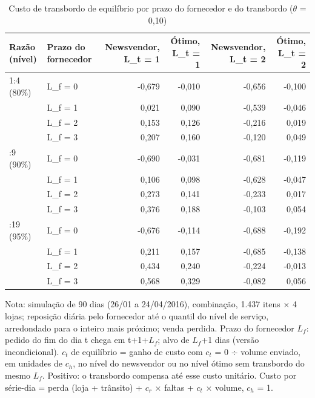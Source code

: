 \begin{table}[htbp]
\centering
\small
\caption{Custo de transbordo de equilíbrio por prazo do fornecedor e do transbordo ($\theta$ = 0,10)}
\label{tab:tbr_ct_equilibrio}
\begin{tabular}{llrrrr}
\toprule
Razão (nível) & Prazo do fornecedor & Newsvendor, L\_t = 1 & Ótimo, L\_t = 1 & Newsvendor, L\_t = 2 & Ótimo, L\_t = 2 \\
\midrule
1:4 (80\%) & L\_f = 0 & -0,679 & -0,010 & -0,656 & -0,100 \\
 & L\_f = 1 & 0,021 & 0,090 & -0,539 & -0,046 \\
 & L\_f = 2 & 0,153 & 0,126 & -0,216 & 0,019 \\
 & L\_f = 3 & 0,207 & 0,160 & -0,120 & 0,049 \\
\addlinespace
1:9 (90\%) & L\_f = 0 & -0,690 & -0,031 & -0,681 & -0,119 \\
 & L\_f = 1 & 0,106 & 0,098 & -0,628 & -0,047 \\
 & L\_f = 2 & 0,273 & 0,141 & -0,233 & 0,017 \\
 & L\_f = 3 & 0,376 & 0,188 & -0,103 & 0,054 \\
\addlinespace
1:19 (95\%) & L\_f = 0 & -0,676 & -0,114 & -0,688 & -0,192 \\
 & L\_f = 1 & 0,211 & 0,157 & -0,685 & -0,138 \\
 & L\_f = 2 & 0,434 & 0,240 & -0,224 & -0,013 \\
 & L\_f = 3 & 0,568 & 0,329 & -0,082 & 0,056 \\
\bottomrule
\end{tabular}
\par\smallskip
{\footnotesize Nota: simulação de 90 dias (26/01 a 24/04/2016), combinação, 1.437 itens × 4 lojas; reposição diária pelo fornecedor até o quantil do nível de serviço, arredondado para o inteiro mais próximo; venda perdida. Prazo do fornecedor $L_f$: pedido do fim do dia t chega em t+1+$L_f$; alvo de $L_f$+1 dias (versão incondicional). $c_t$ de equilíbrio = ganho de custo com $c_t$ = 0 ÷ volume enviado, em unidades de $c_h$, no nível do newsvendor ou no nível ótimo sem transbordo do mesmo $L_f$. Positivo: o transbordo compensa até esse custo unitário. Custo por série-dia = perda (loja + trânsito) + $c_r$ × faltas + $c_t$ × volume, $c_h$ = 1.}
\end{table}
